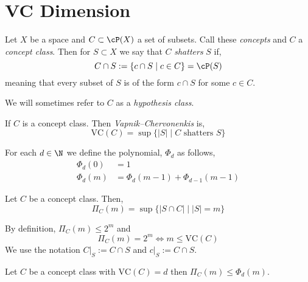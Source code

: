 \documentclass[12pt]{article}
\begin{document}
\section{VC Dimension}

\newcommand{\VC}{\mathrm{VC}}

\begin{defn}
Let $X$ be a space and $C \subset \cP(X)$ a set of subsets. Call these \textit{concepts} and $C$ a \textit{concept class}. Then for $S \subset X$ we say that $C$ \textit{shatters} $S$ if,
\[ C \cap S := \{ c \cap S \mid c \in C \} = \cP(S) \]
meaning that every subset of $S$ is of the form $c \cap S$ for some $c \in C$.
\end{defn}

We will sometimes refer to $C$ as a \textit{hypothesis class}.

\begin{defn}
If $C$ is a concept class. Then \textit{Vapnik–Chervonenkis} is,
\[ \VC(C) = \sup \{ |S| \mid C \text{ shatters } S \} \]
\end{defn}

\begin{defn}
For each $d \in \N$ we define the polynomial, $\Phi_d$ as follows,
\begin{align*}
\Phi_d(0) &= 1
\\
\Phi_d(m) &= \Phi_d(m-1) + \Phi_{d-1}(m-1) 
\end{align*}
\end{defn}

\begin{defn}
Let $C$ be a concept class. Then,
\[ \Pi_C(m) = \sup \{ |S \cap C| \mid |S| = m \} \]
\end{defn}

\begin{rmk}
By definition, $\Pi_C(m) \le 2^m$ and
\[ \Pi_C(m) = 2^m \iff m \le \VC(C) \]
We use the notation $C|_S := C \cap S$ and $c|_S := C \cap S$.
\end{rmk}


\begin{prop}
Let $C$ be a concept class with $\VC(C) = d$ then $\Pi_C(m) \le \Phi_d(m)$.
\end{prop}
\end{document}
